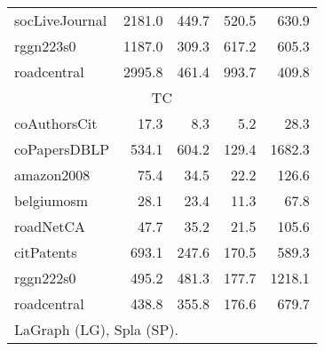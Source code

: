 \begin{table}[tbp]
\begin{center}
\begin{tabular}{|l|r|r|r|r|}
        \rowcolor{black!2 } socLiveJournal&2181.0&449.7&520.5&630.9\\
        \rowcolor{black!10} rggn223s0&1187.0&309.3&617.2&605.3\\
        \rowcolor{black!2 } roadcentral&2995.8&461.4&993.7&409.8\\
        \hline
        \hline
        \multicolumn{5}{|c|}{TC} \\
        \hline
        \rowcolor{black!10} coAuthorsCit&17.3&8.3&5.2&28.3\\
        \rowcolor{black!2 } coPapersDBLP&534.1&604.2&129.4&1682.3\\
        \rowcolor{black!10} amazon2008&75.4&34.5&22.2&126.6\\
        \rowcolor{black!2 } belgiumosm&28.1&23.4&11.3&67.8\\
        \rowcolor{black!10} roadNetCA&47.7&35.2&21.5&105.6\\
        \rowcolor{black!2 } citPatents&693.1&247.6&170.5&589.3\\
        \rowcolor{black!10} rggn222s0&495.2&481.3&177.7&1218.1\\
        \rowcolor{black!2 } roadcentral&438.8&355.8&176.6&679.7\\
        \hline
        \hline
        \multicolumn{5}{l}{LaGraph (LG), Spla (SP).} \\
        \end{tabular}
        \label{rq3_table}
    \end{center}
    \end{table}
    
    